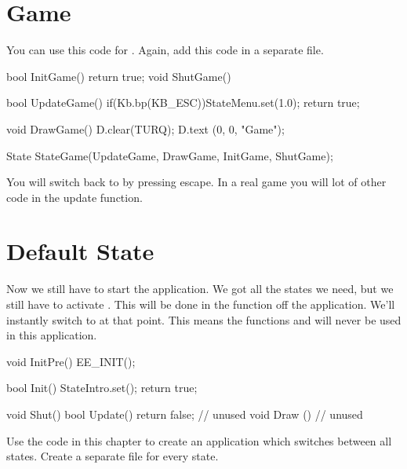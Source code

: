 \section{Game}
You can use this code for . Again, add this code in a separate file.
\begin{code}
bool InitGame() {return true;}
void ShutGame() {}

bool UpdateGame()
{
   if(Kb.bp(KB_ESC))StateMenu.set(1.0);
   return true;
}

void DrawGame()
{
   D.clear(TURQ);
   D.text (0, 0, "Game");
}

State StateGame(UpdateGame, DrawGame, InitGame, ShutGame);
\end{code}

You will switch back to  by pressing escape. In a real game you will lot of other code in the update function.

\section{Default State}
Now we still have to start the application. We got all the states we need, but we still have to activate . This will be done in the  function off the application. We'll instantly switch to  at that point. This means the functions  and  will never be used in this application.

\begin{code}
void InitPre()
{
   EE_INIT();
}

bool Init()
{
   StateIntro.set();
   return true;
}

void Shut() {}
bool Update() {return false;} // unused
void Draw  () {             } // unused
\end{code}

\begin{exercise}
Use the code in this chapter to create an application which switches between all states. Create a separate file for every state.
\end{exercise}
